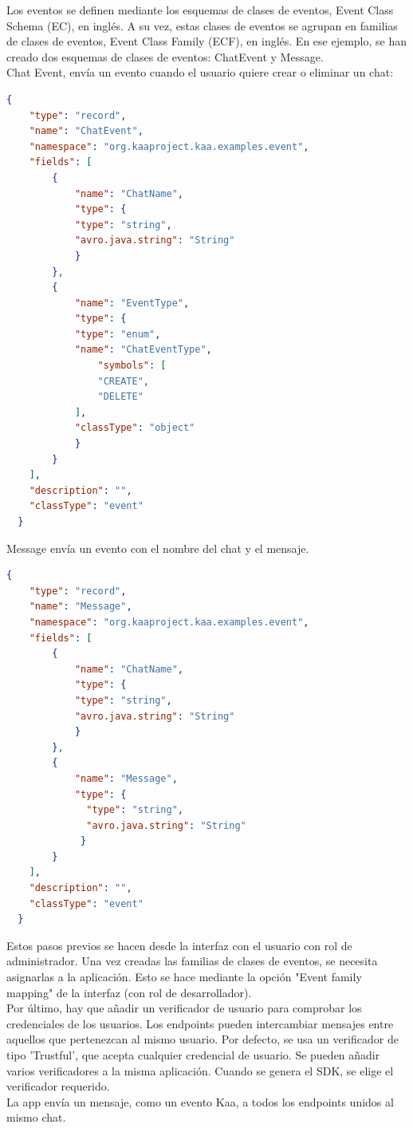 \documentclass[12pt, twoside]{book}
\begin{document}
Los eventos se definen mediante los esquemas de clases de eventos, Event Class Schema (EC), en inglés. A su vez, estas clases de eventos se agrupan en familias de clases de eventos,  Event Class Family (ECF), en inglés. 
En ese ejemplo, se han creado dos esquemas de clases de eventos: ChatEvent y Message.\\
Chat Event, envía un evento cuando el usuario quiere crear o eliminar un chat:
\begin{lstlisting}[language=json]
  {
   	"type": "record",
   	"name": "ChatEvent",
	"namespace": "org.kaaproject.kaa.examples.event",
	"fields": [
		{
			"name": "ChatName",
			"type": {
			"type": "string",
			"avro.java.string": "String"
			}
		},
		{
			"name": "EventType",
			"type": {
			"type": "enum",
			"name": "ChatEventType",
				"symbols": [
				"CREATE",
				"DELETE"
			],
			"classType": "object"
			}
		}
	],
	"description": "",
	"classType": "event"
  }
\end{lstlisting}
Message envía un evento con el nombre del chat y el mensaje.
\begin{lstlisting}[language=json]
  {
	"type": "record",
	"name": "Message",
	"namespace": "org.kaaproject.kaa.examples.event",
	"fields": [
		{
			"name": "ChatName",
			"type": {
			"type": "string",
			"avro.java.string": "String"
		 	}
		},
		{
			"name": "Message",
			"type": {
			  "type": "string",
			  "avro.java.string": "String"
			 }
		}
	],
	"description": "",
	"classType": "event"
  }
\end{lstlisting}
Estos pasos previos se hacen desde la interfaz con el usuario con rol de administrador. Una vez creadas las familias de clases de eventos, se necesita asignarlas a la aplicación. Esto se hace mediante la opción "Event family mapping" de la interfaz (con rol de desarrollador). \\
Por último, hay que añadir 	un verificador de usuario para comprobar los credenciales de los usuarios. Los endpoints pueden intercambiar mensajes entre aquellos que pertenezcan al mismo usuario. Por defecto, se usa un verificador de tipo 'Trustful', que acepta cualquier credencial de usuario. Se pueden añadir varios verificadores a la misma aplicación. Cuando se genera el SDK, se elige el verificador requerido. \\
La app envía un mensaje, como un evento Kaa, a todos los endpoints unidos al mismo chat.
\end{document}

